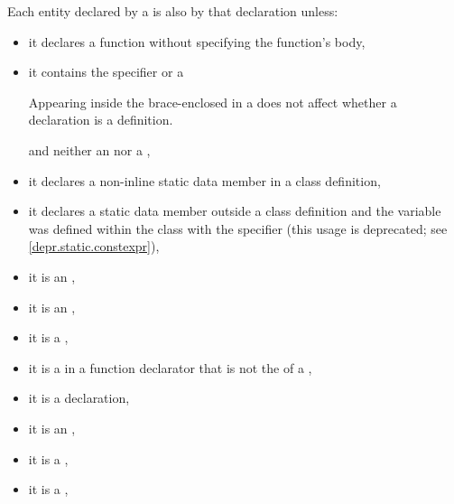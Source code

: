 \pnum
{}%
%
Each entity declared by a  is
also  by that declaration unless:
\begin{itemize}
\item
it declares a function
without specifying the function's body,
\item
it contains
the
%
 specifier or a
\begin{footnote}
Appearing inside the brace-enclosed
 in a  does
not affect whether a declaration is a definition.
\end{footnote}
and neither an  nor a
,
\item
{}%
it declares a non-inline static data member in a class
definition,
\item
it declares a static data member outside a class definition
and the variable was defined within the class with the 
specifier (this usage is deprecated; see \ref{depr.static.constexpr}),
\item
{}%
it is an ,
\item
it is an
%
,
\item
it is a
%
,
\item
it is a
%
 in a function
%
declarator that is not the  of a
,
\item
it is a
%
 declaration,
\item it is
an ,
\item it is
a ,
\item it is
a ,

\end{itemize}

